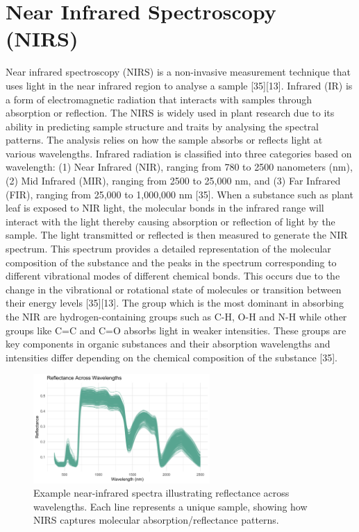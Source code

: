 \documentclass[12pt,a4paper]{report}
\begin{document}
\section{Near Infrared Spectroscopy (NIRS)}
Near infrared spectroscopy (NIRS) is a non-invasive measurement technique that uses light in the near infrared region to analyse a sample [35][13]. Infrared (IR) is a form of electromagnetic radiation that interacts with samples through absorption or reflection. The NIRS is widely used in plant research due to its ability in predicting sample structure and traits by analysing the spectral patterns. The analysis relies on how the sample absorbs or reflects light at various wavelengths. 
Infrared radiation is classified into three categories based on wavelength: (1) Near Infrared (NIR), ranging from 780 to 2500 nanometers (nm), (2) Mid Infrared (MIR), ranging from 2500 to 25,000 nm, and (3) Far Infrared (FIR), ranging from 25,000 to 1,000,000 nm [35]. When a substance such as plant leaf is exposed to NIR light, the molecular bonds in the infrared range will interact with the light thereby causing absorption or reflection of light by the sample. The light transmitted 
or reflected is then measured to generate the NIR spectrum. This spectrum provides a detailed representation of the molecular composition of the substance and the peaks in the spectrum corresponding to different vibrational modes of different chemical bonds. This occurs due to the change in the vibrational or rotational state of molecules or transition between their energy levels [35][13]. The group which is the most dominant in absorbing the NIR are hydrogen-containing groups such as 
C-H, O-H and N-H while other groups like C=C and C=O absorbs light in weaker intensities. These groups are key components in organic substances and their absorption wavelengths and intensities differ depending on the chemical composition of the substance [35]. \\ 

\begin{figure}[h]
    \centering
    \includegraphics[width=0.6\textwidth]{images/NIRS_spectra.png} 
    \caption{Example near-infrared spectra illustrating reflectance across wavelengths. Each line represents a unique sample, showing how NIRS captures molecular absorption/reflectance patterns.}
    \label{Figure 5}
\end{figure}
\end{document}
